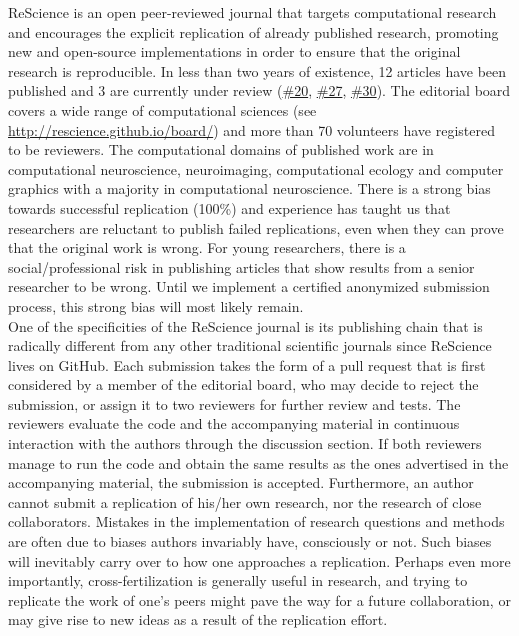 \documentclass[a4paper,10pt, twocolumn]{article}
\begin{document}
ReScience is an open peer-reviewed journal that targets computational research
and encourages the explicit replication of already published research,
promoting new and open-source implementations in order to ensure that the
original research is reproducible. In less than two years of existence, 12
articles have been published and 3 are currently under review
(\href{https://github.com/ReScience/ReScience-submission/pull/20}{\#20},
\href{https://github.com/ReScience/ReScience-submission/pull/27}{\#27},
\href{https://github.com/ReScience/ReScience-submission/pull/30}{\#30}). The
editorial board covers a wide range of computational sciences (see
\url{http://rescience.github.io/board/}) and more than 70 volunteers have registered to be reviewers. The computational domains of published work
are in computational neuroscience, neuroimaging, computational ecology and
computer graphics with a majority in computational neuroscience. There is a
strong bias towards successful replication (100\%) and experience has
taught us that researchers are reluctant to publish failed replications, even when they can prove that the original work is wrong. For young researchers,
there is a social/professional risk in publishing articles that show
results from a senior researcher to be wrong. Until we implement a
certified anonymized submission process, this strong bias will most likely
remain.\\

One of the specificities of the ReScience journal is its publishing chain that is
radically different from any other traditional scientific journals since
ReScience lives on GitHub. Each submission takes the form of a pull request
that is first considered by a member of the editorial board, who may decide to
reject the submission, or assign it to two reviewers for further review and
tests. The reviewers evaluate the code and the accompanying material in
continuous interaction with the authors through the discussion section. If both
reviewers manage to run the code and obtain the same results as the ones
advertised in the accompanying material, the submission is
accepted. Furthermore, an author cannot submit a replication of his/her own
research, nor the research of close collaborators. Mistakes in the
implementation of research questions and methods are often due to biases
authors invariably have, consciously or not. Such biases will inevitably carry
over to how one approaches a replication. Perhaps even more importantly, 
cross-fertilization is generally useful in research, and trying to replicate the work of
one’s peers might pave the way for a future collaboration, or may give rise to
new ideas as a result of the replication effort.\\
\end{document}
